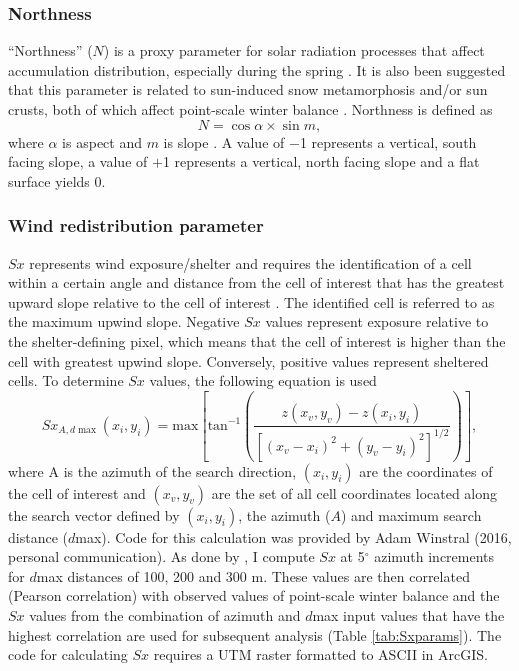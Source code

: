 \documentclass{sfuthesis}
\begin{document}
{\subsubsection*{Northness} 

``Northness'' ($N$) is a proxy parameter for solar radiation processes that affect accumulation distribution, especially during the spring \citep{Revuelto2014}. It is also been suggested that this parameter is related to sun-induced snow metamorphosis and/or sun crusts, both of which affect point-scale winter balance \citep{McGrath2015}. Northness is defined as 
\begin{equation}
N = \cos{\alpha} \times \sin{m},
\end{equation}
where $\alpha$ is aspect and $m$ is slope \citep{Molotch2005}. A value of $-$1 represents a vertical, south facing slope, a value of $+$1 represents a vertical, north facing slope and a flat surface yields 0. 


\subsubsection*{Wind redistribution parameter} 

$Sx$ represents wind exposure/shelter and requires the identification of a cell within a certain angle and distance from the cell of interest that has the greatest upward slope relative to the cell of interest \citep{Winstral2002}. The identified cell is referred to as the maximum upwind slope. Negative $Sx$ values represent exposure relative to the shelter-defining pixel, which means that the cell of interest is higher than the cell with greatest upwind slope. Conversely, positive values represent sheltered cells. To determine $Sx$ values, the following equation is used
\begin{equation}
Sx_{A, d\max}(x_i, y_i) = \textrm{max} \left[ \textrm{tan}^{-1} \left( \frac{z(x_v,y_v)-z(x_i,y_i)}{[(x_v-x_i)^2+(y_v-y_i)^2]^{1/2}} \right) \right] ,
\end{equation}
where A is the azimuth of the search direction, $(x_i, y_i)$ are the coordinates of the cell of interest and $(x_v, y_v)$ are the set of all cell coordinates located along the search vector defined by	$(x_i, y_i)$, the azimuth ($A$) and maximum search distance ($d$max). Code for this calculation was provided by Adam Winstral (2016, personal communication). As done by \cite{McGrath2015}, I compute $Sx$ at 5$^{\circ}$ azimuth increments for $d$max distances of 100, 200 and 300 m. These values are then correlated (Pearson correlation) with observed values of point-scale winter balance and the $Sx$ values from the combination of azimuth and $d$max input values that have the highest correlation are used for subsequent analysis (Table \ref{tab:Sxparams}). The code for calculating $Sx$ requires a UTM raster formatted to ASCII in ArcGIS. 



}
\end{document}
